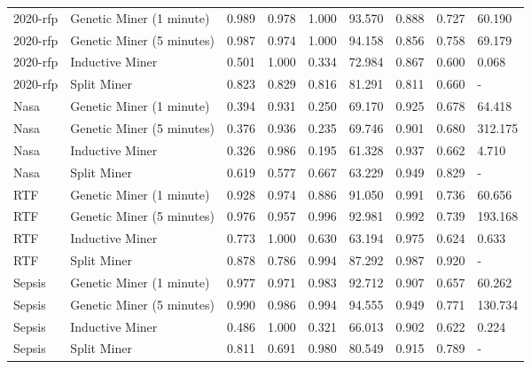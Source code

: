 \begin{tabular}{llrrrrrrl}
2020-rfp & Genetic Miner (1 minute) & 0.989 & 0.978 & 1.000 & 93.570 & 0.888 & 0.727 & 60.190 \\
2020-rfp & Genetic Miner (5 minutes) & 0.987 & 0.974 & 1.000 & 94.158 & 0.856 & 0.758 & 69.179 \\
2020-rfp & Inductive Miner & 0.501 & 1.000 & 0.334 & 72.984 & 0.867 & 0.600 & 0.068 \\
2020-rfp & Split Miner & 0.823 & 0.829 & 0.816 & 81.291 & 0.811 & 0.660 & - \\
Nasa & Genetic Miner (1 minute) & 0.394 & 0.931 & 0.250 & 69.170 & 0.925 & 0.678 & 64.418 \\
Nasa & Genetic Miner (5 minutes) & 0.376 & 0.936 & 0.235 & 69.746 & 0.901 & 0.680 & 312.175 \\
Nasa & Inductive Miner & 0.326 & 0.986 & 0.195 & 61.328 & 0.937 & 0.662 & 4.710 \\
Nasa & Split Miner & 0.619 & 0.577 & 0.667 & 63.229 & 0.949 & 0.829 & - \\
RTF & Genetic Miner (1 minute) & 0.928 & 0.974 & 0.886 & 91.050 & 0.991 & 0.736 & 60.656 \\
RTF & Genetic Miner (5 minutes) & 0.976 & 0.957 & 0.996 & 92.981 & 0.992 & 0.739 & 193.168 \\
RTF & Inductive Miner & 0.773 & 1.000 & 0.630 & 63.194 & 0.975 & 0.624 & 0.633 \\
RTF & Split Miner & 0.878 & 0.786 & 0.994 & 87.292 & 0.987 & 0.920 & - \\
Sepsis & Genetic Miner (1 minute) & 0.977 & 0.971 & 0.983 & 92.712 & 0.907 & 0.657 & 60.262 \\
Sepsis & Genetic Miner (5 minutes) & 0.990 & 0.986 & 0.994 & 94.555 & 0.949 & 0.771 & 130.734 \\
Sepsis & Inductive Miner & 0.486 & 1.000 & 0.321 & 66.013 & 0.902 & 0.622 & 0.224 \\
Sepsis & Split Miner & 0.811 & 0.691 & 0.980 & 80.549 & 0.915 & 0.789 & - \\
\bottomrule
\end{tabular}
